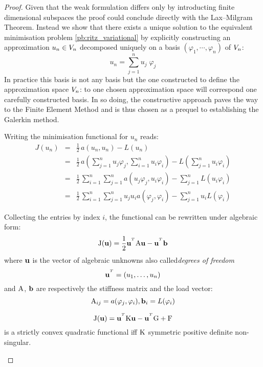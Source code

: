 \begin{proof}
Given that the weak formulation differs only by introducting finite dimensional subspaces the proof could conclude directly with the Lax--Milgram Theorem.
Instead we show that there exists a unique solution to the equivalent minimisation problem \eqref{pb:ritz_variational} by explicitly constructing an approximation $u_n \in {V}_n$ decomposed uniquely on a basis $(\varphi_1,\cdots,\varphi_n)$ of ${V}_n$:
\begin{equation*}
u_n = \sum_{j=1}^{n} u_j\; \varphi_j
\end{equation*}
In practice this basis is not any basis but the one constructed to define the approximation space ${V}_n$: to one chosen approximation space will correspond one carefully constructed basis.
In so doing, the constructive approach paves the way to the Finite Element Method and is thus chosen as a prequel to establishing the Galerkin method.

\medskip
Writing the minimisation functional for $u_n$ reads:
\begin{eqnarray*}
J(u_n) &=& \frac{1}{2}\,a(u_n,u_n) - L(u_n) \\
       &=& \frac{1}{2}\,a(\sum_{j = 1}^{n} u_j \varphi_j,\sum_{i = 1}^{n} u_i \varphi_i) - L(\sum_{j = 1}^{n} u_i \varphi_i) \\
       &=& \frac{1}{2}\,\sum_{i = 1}^{n} \sum_{j = 1}^{n} a(u_j \varphi_j,u_i \varphi_i) - \sum_{j = 1}^{n}  L(u_i \varphi_i) \\
       &=& \frac{1}{2}\,\sum_{i = 1}^{n} \sum_{j = 1}^{n} u_j u_i a(\varphi_j, \varphi_i) - \sum_{j = 1}^{n} u_i L(\varphi_i)
\end{eqnarray*}

\medskip
Collecting the entries by index $i$, the functional can be rewritten under algebraic form:
\begin{equation*}
\matJ(\vecu) = \frac{1}{2} \vecu^\trans\matA \vecu - \vecu^\trans\vecb
\end{equation*}
where $\mathbf u$ is the vector of algebraic unknowns also called\textit{degrees of freedom}
\begin{equation*}
\vecu^\trans= (u_1,\dots,u_n)
\end{equation*}
and ${\mathrm A}$, $\mathbf b$ are respectively the stiffness matrix and the load vector:
\begin{equation*}
{\mathrm A}_{ij} = a(\varphi_j, \varphi_i), \mathbf b_{i} = L(\varphi_i)
\end{equation*}

\begin{prpstn}\label{prp:convexity_J}
\begin{equation*}
\matJ(\vecu) = \vecu^\trans\matK \vecu - \vecu^\trans \matG + \matF
\end{equation*}
is a strictly convex quadratic functional iff ${\mathrm K}$ symmetric positive definite non-singular.
\end{prpstn}


\end{proof}
